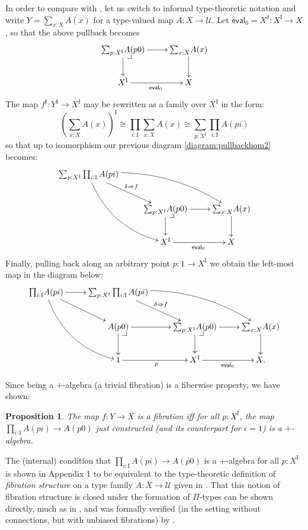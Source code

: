\documentclass[11pt]{article}
\makeatletter
\newcommand{\pbcorner}[1][dr]{\save*!/#1-1.2pc/#1:(-1,1)@^{|-}\restore}
\newcommand{\ra}{\ensuremath{\rightarrow}}
\newcommand{\I}{\ensuremath{\mathrm{I}}}
\newcommand{\U}{\ensuremath{\mathcal{U}}}
\newtheorem{proposition}[theorem]{Proposition}
\theoremstyle{remark}
\theoremstyle{definition}
\makeatother
\begin{document}
In order to compare with \cite{OP}, let us switch to informal type-theoretic notation and write $Y=\sum_{x:X}A(x)$ for a type-valued map $A : X\ra \U$.  Let $\mathsf{eval}_0 = X^\delta : X^\I\ra X$, so that the above pullback becomes
\begin{equation*}\label{diagram:pullbackhom3}
\xymatrix{
 {\sum_{p:X^\I}}A(p0) \ar[d] \ar[r] \pbcorner & {\sum_{x:X}}A(x) \ar[d] \\
 X^\I \ar[r]_{\mathsf{eval}_0} &  X
}
\end{equation*}
The map $f^\I:Y^\I\ra X^\I$ may be rewritten as a family over $X^\I$ in the form:
\[
(\sum_{x:X}A(x))^\I \cong \prod_{i:\I}\sum_{x:X}A(x) \cong \sum_{p:X^\I}\prod_{i:\I}A(pi)
\]
so that up to isomorphism our previous diagram \eqref{diagram:pullbackhom2} becomes:
\begin{equation*}\label{diagram:pullbackhom3}
\xymatrix{
{\sum_{p:X^\I}}\prod_{i:\I}A(pi) \ar@/_4ex/ [rdd] \ar[rd]^{\delta\Rightarrow{f}} \ar@/^4ex/ [rrd] && \\
& {\sum_{p:X^\I}}A(p0) \ar[d] \ar[r] \pbcorner & {\sum_{x:X}}A(x) \ar[d] \\
& X^\I \ar[r]_{\mathsf{eval}_0} &  X
}
\end{equation*}
Finally, pulling back along an arbitrary point $p : 1\ra X^\I$ we obtain the left-most map in the diagram below:
\begin{equation*}\label{diagram:pullbackhom3}
\xymatrix{
{\prod_{i:\I}}A(pi) \ar@/_4ex/ [rdd] \ar[rd] \ar[r] 
	& {\sum_{p:X^\I}}\prod_{i:\I}A(pi)  \ar[rd]^{\delta\Rightarrow{f}} \ar@/^4ex/ [rrd] && \\
& A(p0) \ar[d] \ar[r] \pbcorner & {\sum_{p:X^\I}}A(p0) \ar[d] \ar[r] \pbcorner & {\sum_{x:X}}A(x) \ar[d] \\
& 1 \ar[r]_{p} & X^\I \ar[r]_{\mathsf{eval}_0} &  X.
}
\end{equation*}

Since being a $+$-algebra (a trivial fibration) is a fiberwise property, we have shown:
\begin{proposition}
The map $f : Y\ra X$ is a fibration iff for all $p: X^\I$, the map ${\prod_{i:\I}}A(pi) \ra A(p0)$ just constructed (and its counterpart for $\epsilon = 1$) is a $+$-algebra.
\end{proposition}

The (internal) condition that ${\prod_{i:\I}}A(pi) \ra A(p0)$ is a $+$-algebra for all $p: X^\I$ is shown in Appendix 1 to be equivalent to the type-theoretic definition of \emph{fibration structure} on a type family $A: X\ra \U$ given in \cite{OP}.  That this notion of fibration structure is closed under the formation of $\Pi$-types can be shown directly, much as in \cite{OP}, and was formally verified (in the setting without connections, but with unbiased fibrations) by \cite{Zesen}.
\end{document}
